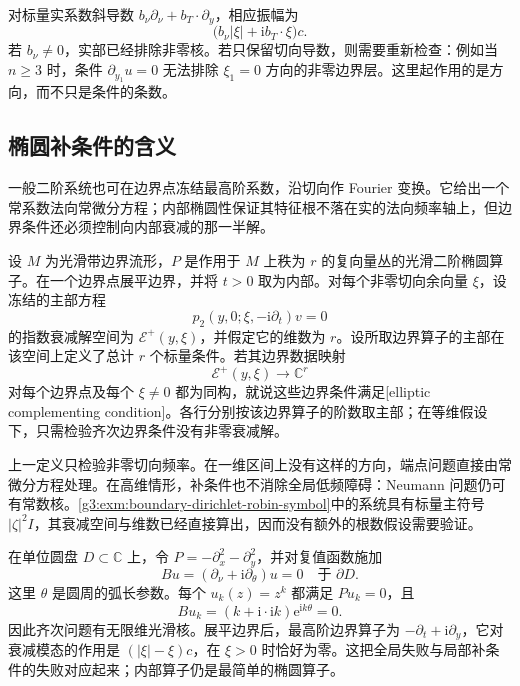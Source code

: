 对标量实系数斜导数 \(b_\nu\partial_\nu+b_T\cdot\partial_y\)，相应振幅为
\[
	\bigl(b_\nu|\xi|+\mathrm i b_T\cdot\xi\bigr)c.
\]
若 \(b_\nu\ne0\)，实部已经排除非零核。若只保留切向导数，则需要重新检查：例如当 \(n\ge3\) 时，条件 \(\partial_{y_1}u=0\) 无法排除 \(\xi_1=0\) 方向的非零边界层。这里起作用的是方向，而不只是条件的条数。

\subsection{椭圆补条件的含义}
\label{g3:subsec:1403:02}
一般二阶系统也可在边界点冻结最高阶系数，沿切向作 Fourier 变换。它给出一个常系数法向常微分方程；内部椭圆性保证其特征根不落在实的法向频率轴上，但边界条件还必须控制向内部衰减的那一半解。

\begin{definition}\label{g3:def:complementing-boundary-condition}
	设 \(M\) 为光滑带边界流形，\(P\) 是作用于 \(M\) 上秩为 \(r\) 的复向量丛的光滑二阶椭圆算子。在一个边界点展平边界，并将 \(t>0\) 取为内部。对每个非零切向余向量 \(\xi\)，设冻结的主部方程
	\[
		p_2(y,0;\xi,-\mathrm i\partial_t)v=0
	\]
	的指数衰减解空间为 \(\mathcal E^+(y,\xi)\)，并假定它的维数为 \(r\)。设所取边界算子的主部在该空间上定义了总计 \(r\) 个标量条件。若其边界数据映射
	\[
		\mathcal E^+(y,\xi)\longrightarrow\mathbb C^r
	\]
	对每个边界点及每个 \(\xi\ne0\) 都为同构，就说这些边界条件满足[elliptic complementing condition]。各行分别按该边界算子的阶数取主部；在等维假设下，只需检验齐次边界条件没有非零衰减解。
\end{definition}

上一定义只检验非零切向频率。在一维区间上没有这样的方向，端点问题直接由常微分方程处理。在高维情形，补条件也不消除全局低频障碍：Neumann 问题仍可有常数核。\cref{g3:exm:boundary-dirichlet-robin-symbol}中的系统具有标量主符号 \(|\zeta|^2I\)，其衰减空间与维数已经直接算出，因而没有额外的根数假设需要验证。

\begin{example}\label{g3:exm:elliptic-bad-boundary-disk}
	在单位圆盘 \(D\subset\mathbb C\) 上，令 \(P=-\partial_x^2-\partial_y^2\)，并对复值函数施加
	\[
		Bu=(\partial_\nu+\mathrm i\partial_\theta)u=0
		\quad\text{于 }\partial D.
	\]
	这里 \(\theta\) 是圆周的弧长参数。每个 \(u_k(z)=z^k\) 都满足 \(Pu_k=0\)，且
	\[
		Bu_k=(k+\mathrm i\cdot\mathrm i k)\mathrm e^{\mathrm i k\theta}=0.
	\]
	因此齐次问题有无限维光滑核。展平边界后，最高阶边界算子为 \(-\partial_t+\mathrm i\partial_y\)，它对衰减模态的作用是 \((|\xi|-\xi)c\)，在 \(\xi>0\) 时恰好为零。这把全局失败与局部补条件的失败对应起来；内部算子仍是最简单的椭圆算子。
\end{example}

